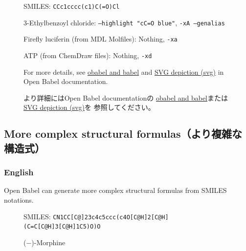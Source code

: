 \documentclass[12pt]{ltjsarticle}
\begin{document}
\begin{figure}[ht]
  \centering
  \caption{3-Ethylbenzoyl chloride: \texttt{--highlight "cC=O blue"}, \texttt{-xA --genalias}}
  SMILES: \verb|CCc1cccc(c1)C(=O)Cl|
\end{figure}

\begin{figure}[ht]
  \centering
  \caption{Firefly luciferin (from MDL Molfiles): Nothing, \texttt{-xa}}
\end{figure}

\begin{figure}[ht]
  \centering
  \caption{ATP (from ChemDraw files): Nothing, \texttt{-xd}}
\end{figure}

\begin{figure}[ht]
For more details, see
\href{http://openbabel.org/docs/dev/Command-line_tools/babel.html}{obabel and babel}
and
\href{http://openbabel.org/docs/dev/FileFormats/SVG_2D_depiction.html}{SVG depiction (svg)}
in Open Babel documentation.

より詳細にはOpen Babel documentationの
\href{http://openbabel.org/docs/dev/Command-line_tools/babel.html}{obabel and babel}または
\href{http://openbabel.org/docs/dev/FileFormats/SVG_2D_depiction.html}{SVG depiction (svg)}を
参照してください。
\end{figure}

\clearpage

\subsection{More complex structural formulas（より複雑な構造式）}

\subsubsection{English}

Open Babel can generate more complex structural formulas from SMILES notations.

\begin{figure}[ht]
  \centering
  \caption{($-$)-Morphine}
  SMILES: \verb|CN1CC[C@]23c4c5ccc(c4O[C@H]2[C@H](C=C[C@H]3[C@H]1C5)O)O|
\end{figure}
\end{document}

